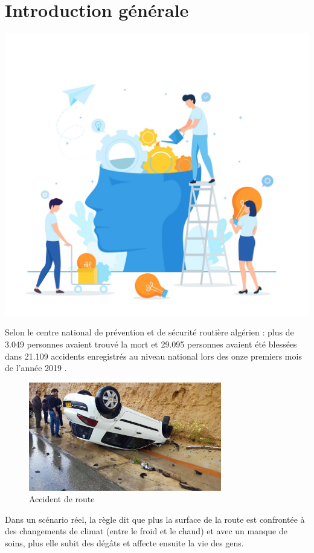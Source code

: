 \chapter*{Introduction générale}
\renewcommand{\thesection}{\arabic{section}}
		



\label{chapitre1}
		
		\includegraphics [width=1 \linewidth, height=0.8\textheight, keepaspectratio] {Images/chapterFigures/chOne.png}
		
	
		
		\newpage
Selon le centre national de prévention et de sécurité routière algérien :
plus de 3.049 personnes avaient trouvé la mort et 29.095 personnes avaient été blessées
dans 21.109 accidents enregistrés au niveau national lors des onze premiers mois de l'année 2019  \cite{nassimaAccidentsRouteAlger}.
\begin{figure}[h!]
  \center
  \includegraphics[width=0.75\textwidth]{Images/chapter1/accident.jpg}
  \caption{Accident de route}
  \label{fig:Accident}
\end{figure}
Dans un scénario réel, la règle dit que plus la surface de la route est confrontée
à des changements de climat (entre le froid et le chaud) et avec un manque de soins,
plus elle subit des dégâts et affecte ensuite la vie des gens.

